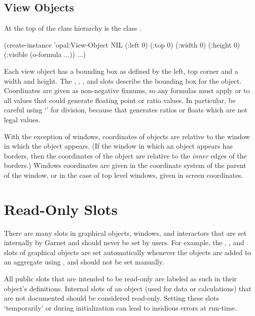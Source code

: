 \begin{group}
\section{View Objects}
At the top of the class hierarchy is the class .

    
\begin{programexample}
(create-instance 'opal:View-Object NIL
  (:left 0)
  (:top 0)
  (:width 0)
  (:height 0)
  (:visible (o-formula ...))
  ...)
\end{programexample}
\end{group}
\vspace{1 line}

Each view object has a bounding box as defined by the left, top corner and
a width and height.  The , , , and 
slots describe the bounding box for the object.  Coordinates are given as
non-negative fixnums, so any formulas must apply  or 
to all values that could generate floating point or ratio values.  In
particular, be
careful using `\pr{/}' for division, because that generates ratios or floats
which are not legal values.

With the exception of windows, coordinates of objects are relative to the
window in which the object appears.  (If the window in which an object
appears has borders, then the coordinates of the object are relative to the
{\it inner} edges of the borders.)  Windows coordinates are given in
the coordinate system of the parent of the window, or in the case of top level
windows, given in screen coordinates.

\section{Read-Only Slots}

There are many slots in graphical objects, windows, and interactors that are
set internally by Garnet and should never be set by users.  For example,
the , , and  slots of graphical objects
are set automatically whenever the objects are added to an aggregate using
, and should not be set manually.

All public slots that are intended to be
read-only are labeled as such in their object's definitions.  Internal slots
of an object (used for data or calculations) that are not documented should
be considered read-only.  Setting these
slots `temporarily' or during initialization can lead to insidious errors
at run-time.


